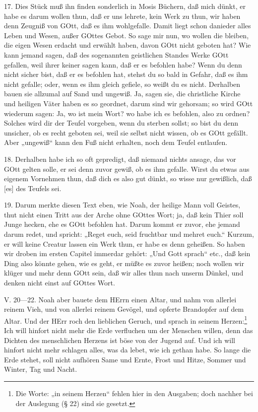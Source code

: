 17. Dies Stück muß ihn finden sonderlich in Mosis Büchern, daß mich dünkt, er habe es darum wollen thun, daß er uns lehrete, kein Werk zu thun, wir haben denn Zeugniß von GOtt, daß es ihm wohlgefalle. Damit liegt schon danieder alles Leben und Wesen, außer GOttes Gebot. So sage mir nun, wo wollen die bleiben, die eigen Wesen erdacht und erwählt haben, davon GOtt nicht geboten hat? Wie kann jemand sagen, daß des sogenannten geistlichen Standes Werke GOtt gefallen, weil ihrer keiner sagen kann, daß er es befohlen habe? Wenn du denn nicht sicher bist, daß er es befohlen hat, stehst du so bald in Gefahr, daß es ihm nicht gefalle; oder, wenn es ihm gleich gefiele, so weißt du es nicht. Derhalben bauen sie allzumal auf Sand und ungewiß. Ja, sagen sie, die christliche Kirche und heiligen Väter haben es so geordnet, darum sind wir gehorsam; so wird GOtt wiederum sagen: Ja, wo ist mein Wort? wo habe ich es befohlen, also zu ordnen?
Solches wird dir der Teufel vorgeben, wenn du sterben sollst; so bist du denn unsicher, ob es recht geboten sei, weil sie selbst nicht wissen, ob es GOtt gefällt. Aber „ungewiß“ kann den Fuß nicht erhalten, noch dem Teufel entlaufen.

18. Derhalben habe ich so oft gepredigt, daß niemand nichts ansage, das vor GOtt gelten solle, er sei denn zuvor gewiß, ob es ihm gefalle. Wirst du etwas aus eigenem Vornehmen thun, daß dich es also gut dünkt, so wisse nur gewißlich, daß [es] des Teufels sei.

19. Darum merkte diesen Text eben, wie Noah, der heilige Mann voll Geistes, thut nicht einen Tritt aus der Arche ohne GOttes Wort; ja, daß kein Thier soll Junge hecken, ehe es GOtt befohlen hat. Darum kommt er zuvor, ehe jemand darum redet, und spricht: „Reget euch, seid fruchtbar und mehret euch.“ Kurzum, er will keine Creatur lassen ein Werk thun, er habe es denn geheißen. So haben wir droben im ersten Capitel immerdar gehört: „Und Gott sprach“ etc., daß kein Ding also könnte gehen, wie es geht, er müßte es zuvor heißen; noch wollen wir klüger und mehr denn GOtt sein, daß wir alles thun nach unserm Dünkel, und denken nicht einst auf GOttes Wort.

\begin{schriftzitat}
V. 20—22. Noah aber bauete dem HErrn einen Altar, und nahm von allerlei reinem Vieh, und von allerlei reinem Gevögel, und opferte Brandopfer auf dem Altar. Und der HErr roch den lieblichen Geruch, und sprach in seinem Herzen:\footnote{Die Worte: „in seinem Herzen“ fehlen hier in den Ausgaben; doch nachher bei der Auslegung (§ 22) sind sie gesetzt.} Ich will hinfort nicht mehr die Erde verfluchen um der Menschen willen, denn das Dichten des menschlichen Herzens ist böse von der Jugend auf. Und ich will hinfort nicht mehr schlagen alles, was da lebet, wie ich gethan habe. So lange die Erde stehet, soll nicht aufhören Same und Ernte, Frost und Hitze, Sommer und Winter, Tag und Nacht.
\end{schriftzitat}

